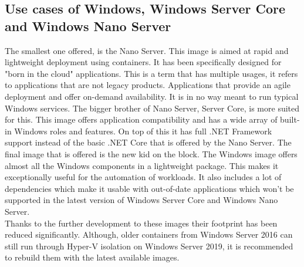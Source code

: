 \subsection{Use cases of Windows, Windows Server Core and Windows Nano Server}
The smallest one offered, is the Nano Server. This image is aimed at rapid and lightweight deployment using containers. It has been specifically designed for "born in the cloud" applications. This is a term that has multiple usages, it refers to applications that are not legacy products. Applications that provide an agile deployment and offer on-demand availability. It is in no way meant to run typical Windows services. The bigger brother of Nano Server, Server Core, is more suited for this. 
This image offers application compatibility and has a wide array of built-in Windows roles and features. On top of this it has full .NET Framework support instead of the basic .NET Core that is offered by the Nano Server. 
The final image that is offered is the new kid on the block. The Windows image offers almost all the Windows components in a lightweight package. This makes it exceptionally useful for the automation of workloads. It also includes a lot of dependencies which make it usable with out-of-date applications which won't be supported in the latest version of Windows Server Core and Windows Nano Server. 
\\
Thanks to the further development to these images their footprint has been reduced significantly. Although, older containers from Windows Server 2016 can still run through Hyper-V isolation on Windows Server 2019, it is recommended to rebuild them with the latest available images.




